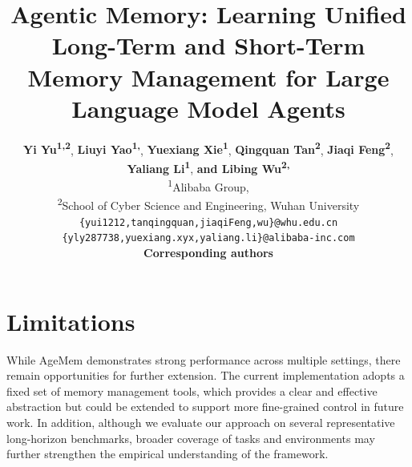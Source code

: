 \documentclass[11pt]{article}
\title{Agentic Memory: Learning Unified Long-Term and Short-Term Memory Management for Large Language Model Agents}
\author{
  \textbf{Yi Yu\textsuperscript{1,2}},
  \textbf{Liuyi Yao\textsuperscript{1,\dag}},
  \textbf{Yuexiang Xie\textsuperscript{1}},
  \textbf{Qingquan Tan\textsuperscript{2}},
  \textbf{Jiaqi Feng\textsuperscript{2}},
\\
  \textbf{Yaliang Li\textsuperscript{1}},
  \textbf{and Libing Wu\textsuperscript{2,\dag}}
\\
  \textsuperscript{1}Alibaba Group, 
\\
  \textsuperscript{2}School of Cyber Science and Engineering, Wuhan University
\\
  \small{
   \texttt{\{yui1212,tanqingquan,jiaqiFeng,wu\}@whu.edu.cn}
  }
\\
  \small{
   \texttt{\{yly287738,yuexiang.xyx,yaliang.li\}@alibaba-inc.com}
  }
\\
 \small{
 \textbf{\dag Corresponding authors}
 }
}
\begin{document}
\maketitle



% 





\section*{Limitations}

While AgeMem demonstrates strong performance across multiple settings, there remain opportunities for further extension. The current implementation adopts a fixed set of memory management tools, which provides a clear and effective abstraction but could be extended to support more fine-grained control in future work. In addition, although we evaluate our approach on several representative long-horizon benchmarks, broader coverage of tasks and environments may further strengthen the empirical understanding of the framework.



%


\newpage


\end{document}
